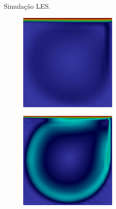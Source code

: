 \begin{figure}[h!]
\begin{subfigure}{\textwidth}
\begin{subfigure}{\textwidth}
\begin{subfigure}{.32\textwidth}
            \end{subfigure}
            \caption{Simulação LES.}
        \end{subfigure}
        \begin{subfigure}{\textwidth}\centering
            \begin{subfigure}{.32\textwidth}
                \includegraphics[width=\linewidth]{Figuras/cavity-poor/VMS-Lin.png}
            \end{subfigure}
            \begin{subfigure}{.32\textwidth}
                \includegraphics[width=\linewidth]{Figuras/cavity-poor/VMS-Qua.png}

\end{subfigure}
\end{subfigure}
\end{subfigure}
\end{figure}
